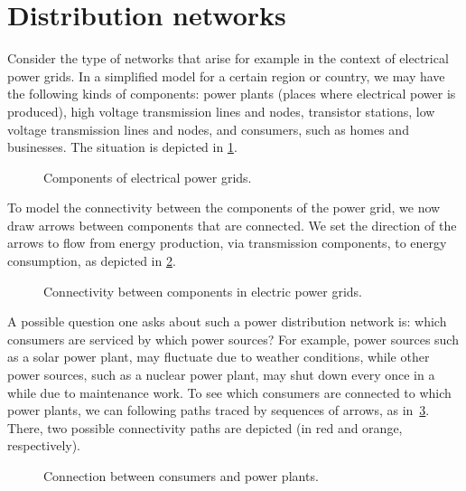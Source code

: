 

\section{Distribution networks}\label{sec:connection-distribution-networks}

Consider the type of networks that arise for example in the context of electrical power grids. In a simplified model for a certain region or country, we may have the following kinds of components: power plants (places where electrical power is produced), high voltage transmission lines and nodes, transistor stations, low voltage transmission lines and nodes, and consumers, such as homes and businesses. The situation is depicted in \cref{fig:power_nodes}.

\begin{figure}[h!]
  \centering
  \caption{Components of electrical power grids.}
  \label{fig:power_nodes}
\end{figure}
To model the connectivity between the components of the power grid, we now draw arrows between components that are connected. We set the direction of the arrows to flow from energy production, via transmission components, to energy consumption, as depicted in \cref{fig:power_nodes_connected}.
\begin{figure}[h!]
  \centering
  \caption{Connectivity between components in electric power grids.}
  \label{fig:power_nodes_connected}
\end{figure}

A possible question one asks about such a power distribution network is: which consumers are serviced by which power sources? For example, power sources such as a solar power plant, may fluctuate due to weather conditions, while other power sources, such as a nuclear power plant, may shut down every once in a while due to maintenance work. To see which consumers are connected to which power plants, we can following paths traced by sequences of arrows, as in~\cref{fig:power_paths}. There, two possible connectivity paths are depicted (in red and orange, respectively).


\begin{figure}[h!]
  \centering
  \caption{Connection between consumers and power plants.}
  \label{fig:power_paths}
\end{figure}


